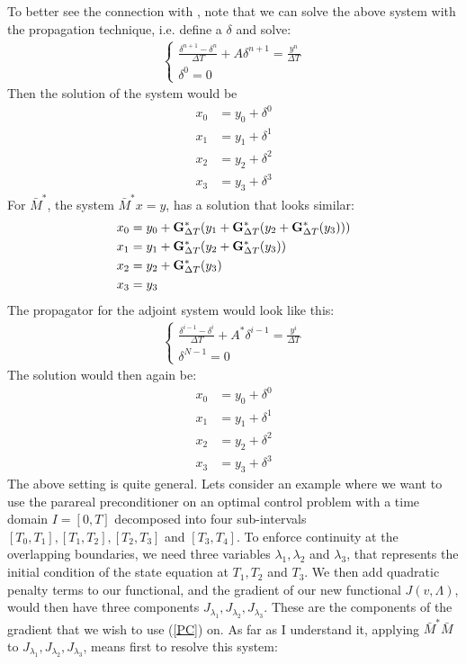 To better see the connection with \cite{lions2001resolution}, note that we can solve the above system with the propagation technique, i.e. define a $\delta$ and solve:
\begin{align}
\left\{
     \begin{array}{lr}
		\frac{\delta^{n+1} -\delta^n }{\Delta T } + A\delta^{n+1} = \frac{y^n}{\Delta T} \\
		\delta^0 = 0
	\end{array} \right.
\end{align} 
Then the solution of the system would be 
\begin{align*}
x_0 &=y_0 +\delta^0\\
x_1 &=y_1 + \delta^1 \\
x_2 &=y_2 +\delta^2\\
x_3 &=y_3 + \delta^3 
\end{align*}
For $\bar{M}^{*}$, the system $\bar{M}^{*}x=y$, has a solution that looks similar:
\begin{align*}
x_0 &=y_0 +\bold{G}_{\Delta T}^*(y_1 + \bold{G}_{\Delta T}^*(y_2 + \bold{G}_{\Delta T}^*(y_ 3)))\\
x_1 &=y_1 + \bold{G}_{\Delta T}^*(y_2 + \bold{G}_{\Delta T}^*(y_ 3))\\
x_2 &=y_2 + \bold{G}_{\Delta T}^*(y_ 3) \\
x_3 &=y_3 
\end{align*}
The propagator for the adjoint system would look like this:
\begin{align}
\left\{
     \begin{array}{lr}
		\frac{\delta^{i-1} -\delta^i }{\Delta T } + A^*\delta^{i-1} = \frac{y^i}{\Delta T} \\
		\delta^{N-1} = 0
	\end{array} \right.
\end{align} 
The solution would then again be:
\begin{align*}
x_0 &=y_0 +\delta^0\\
x_1 &=y_1 + \delta^1 \\
x_2 &=y_2 +\delta^2\\
x_3 &=y_3 + \delta^3 
\end{align*}
The above setting is quite general. Lets consider an example where we want to use the parareal preconditioner on an optimal control problem with a time domain $I=[0,T]$ decomposed into four sub-intervals $[T_0,T_1], [T_1,T_2], [T_2,T_3]$ and $[T_3,T_4]$. To enforce continuity at the overlapping boundaries, we need three variables $\lambda_1,\lambda_2$ and $\lambda_3$, that represents the initial condition of the state equation at $T_1,T_2$ and $T_3$. We then add quadratic penalty terms to our functional, and the gradient of our new functional $J(v,\Lambda)$, would then have three components $J_{\lambda_1}, J_{\lambda_2}, J_{\lambda_3}$. These are the components of the gradient that we wish to use (\ref{PC}) on. As far as I understand it, applying $\bar{M}^{*}\bar{M}$ to $J_{\lambda_1}, J_{\lambda_2}, J_{\lambda_3}$, means first to resolve this system:

